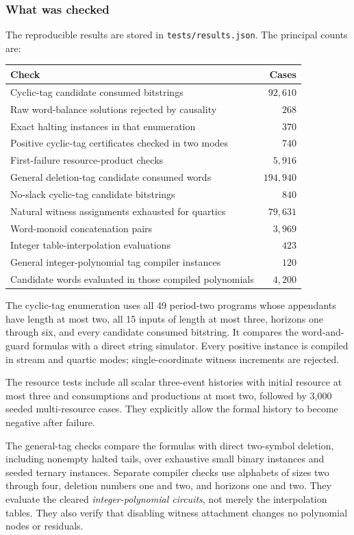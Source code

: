\documentclass[11pt,a4paper]{article}
\theoremstyle{definition}
\theoremstyle{remark}
\begin{document}
\subsubsection{What was checked}
The reproducible results are stored in \texttt{tests/results.json}. The principal counts are:
\begin{center}
\small
\begin{tabularx}{\textwidth}{@{}Xr@{}}
\toprule
Check & Cases\\
\midrule
Cyclic-tag candidate consumed bitstrings & $92{,}610$\\
Raw word-balance solutions rejected by causality & $268$\\
Exact halting instances in that enumeration & $370$\\
Positive cyclic-tag certificates checked in two modes & $740$\\
First-failure resource-product checks & $5{,}916$\\
General deletion-tag candidate consumed words & $194{,}940$\\
No-slack cyclic-tag candidate bitstrings & $840$\\
Natural witness assignments exhausted for quartics & $79{,}631$\\
Word-monoid concatenation pairs & $3{,}969$\\
Integer table-interpolation evaluations & $423$\\
General integer-polynomial tag compiler instances & $120$\\
Candidate words evaluated in those compiled polynomials & $4{,}200$\\
\bottomrule
\end{tabularx}
\end{center}
The cyclic-tag enumeration uses all 49 period-two programs whose appendants have length at most two, all 15 inputs of length at most three, horizons one through six, and every candidate consumed bitstring. It compares the word-and-guard formulas with a direct string simulator. Every positive instance is compiled in stream and quartic modes; single-coordinate witness increments are rejected.

The resource tests include all scalar three-event histories with initial resource at most three and consumptions and productions at most two, followed by 3,000 seeded multi-resource cases. They explicitly allow the formal history to become negative after failure.

The general-tag checks compare the formulas with direct two-symbol deletion, including nonempty halted tails, over exhaustive small binary instances and seeded ternary instances. Separate compiler checks use alphabets of sizes two through four, deletion numbers one and two, and horizons one and two. They evaluate the cleared \emph{integer-polynomial circuits}, not merely the interpolation tables. They also verify that disabling witness attachment changes no polynomial nodes or residuals.
\end{document}
